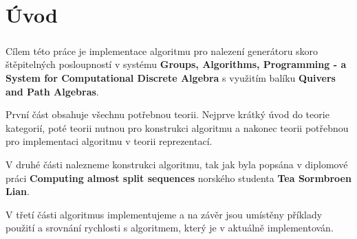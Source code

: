 \clearpage
\setcounter{page}{1} 

\chapter{Úvod}

\paragraph{ } Cílem této práce je implementace algoritmu pro nalezení generátoru skoro 
štěpitelných posloupností v systému \cite{GAP4} \textbf{Groups, Algorithms, Programming -
a System for Computational Discrete Algebra} s využitím balíku \cite{QPA} 
\textbf{Quivers and Path Algebras}.  

První část obsahuje všechnu potřebnou teorii. Nejprve krátký úvod do teorie kategorií,
poté teorii nutnou pro konstrukci algoritmu 
a nakonec teorii potřebnou pro implementaci algoritmu v teorii reprezentací.

V druhé části nalezneme konstrukci algoritmu, tak jak byla popsána v 
diplomové práci \cite{3} \textbf{Computing almost split sequences} norského studenta 
\textbf{Tea Sormbroen Lian}.

V třetí části algoritmus implementujeme a na závěr jsou umístěny příklady 
použití a srovnání rychlosti s algoritmem, který je v \cite{QPA} aktuálně 
implementován.


